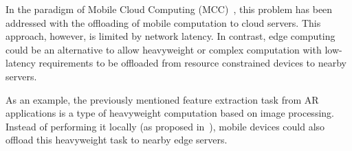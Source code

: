 In the paradigm of Mobile Cloud Computing (MCC)~\cite{Khan:14}, this problem has been addressed with the offloading of mobile computation to cloud servers. This approach, however, is limited by network latency. In contrast, edge computing could be an alternative to allow heavyweight or complex computation with low-latency requirements to be offloaded from resource constrained devices to nearby servers.


As an example, the previously mentioned feature extraction task from AR applications is a type of heavyweight computation based on image processing. Instead of performing it locally (as proposed in~\cite{Huang2012}), mobile devices could also offload this heavyweight task to nearby edge servers. 


